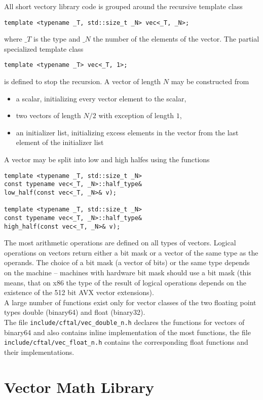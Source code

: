 \documentclass[10pt,a4paper,final,oneside]{article}
\numberwithin{equation}{subsection}
\begin{document}
All short vectory library code is grouped around the recursive template
class
\begin{lstlisting}
template <typename _T, std::size_t _N> vec<_T, _N>;
\end{lstlisting}
where $\_T$ is the type and $\_N$ the number of the elements of the
vector. The partial specialized template class
\begin{lstlisting}
template <typename _T> vec<_T, 1>;
\end{lstlisting}
is defined to stop the recursion.
%
A vector of length $N$ may be constructed from
\begin{itemize}
\item a scalar, initializing every vector element to the scalar,
\item two vectors of length $N/2$ with exception of length $1$,
\item an initializer list, initializing excess elements in the
  vector from the last element of the initializer list
\end{itemize}
A vector may be split into low and high halfes using the functions
\begin{lstlisting}
template <typename _T, std::size_t _N>
const typename vec<_T, _N>::half_type&
low_half(const vec<_T, _N>& v);

template <typename _T, std::size_t _N>
const typename vec<_T, _N>::half_type&
high_half(const vec<_T, _N>& v);
\end{lstlisting}
The most arithmetic operations are defined on all types of vectors.
Logical operations on vectors return either a bit mask or a vector of
the same type as the operands. The choice of a bit mask (a vector of
bits) or the same type depends on the machine -- machines with
hardware bit mask should use a bit mask (this means, that on x86 the
type of the result of logical operations depends on the existence of
the 512 bit AVX vector extensions). \\[10pt]
%
A large number of functions exist only for vector classes of the
two floating point types double (binary64) and float (binary32).\\
The file \texttt{include/cftal/vec\_double\_n.h} declares the functions
for vectors of binary64 and also contains inline implementation of
the most functions, the file \texttt{include/cftal/vec\_float\_n.h} contains
the corresponding float functions and their implementations.

\section{Vector Math Library}
\label{sec:vec_math_lib}
\end{document}
